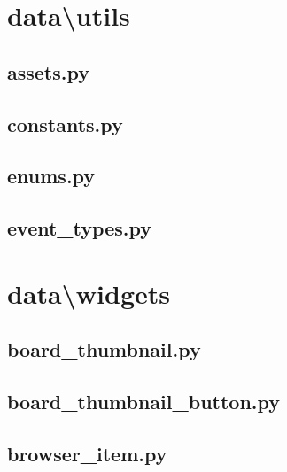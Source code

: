 \documentclass[../main/main.tex]{subfiles}
\begin{document}
\section{data\textbackslash utils}
\subsection{assets.py}

\label{src:data/utils/assets.py}

\subsection{constants.py}

\label{src:data/utils/constants.py}

\subsection{enums.py}

\label{src:data/utils/enums.py}

\subsection{event\_types.py}

\label{src:data/utils/event_types.py}

\section{data\textbackslash widgets}
\label{src:widgets}
\subsection{board\_thumbnail.py}

\label{src:data/widgets/board_thumbnail.py}

\subsection{board\_thumbnail\_button.py}

\label{src:data/widgets/board_thumbnail_button.py}

\subsection{browser\_item.py}

\label{src:data/widgets/browser_item.py}
\end{document}
